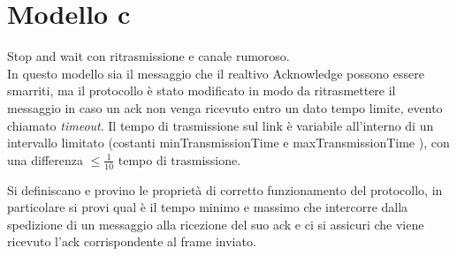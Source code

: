 \documentclass[a4paper]{article}
\begin{document}
\section{Modello c}
Stop and wait con ritrasmissione e canale rumoroso.\\
In questo modello sia il messaggio che il realtivo Acknowledge possono essere smarriti, ma il protocollo è stato modificato in modo da ritrasmettere il messaggio in caso un ack non venga ricevuto entro un dato tempo limite, evento chiamato \textit{timeout}.
Il tempo di trasmissione sul link è variabile all’interno di un intervallo limitato (costanti minTransmissionTime e maxTransmissionTime ), con una differenza $\leq \frac{1}{10}$ tempo di trasmissione.

Si definiscano e provino le proprietà di corretto funzionamento del protocollo, in particolare si provi qual è il tempo minimo e massimo che intercorre dalla spedizione di un messaggio alla ricezione del suo ack e ci si assicuri che viene ricevuto l'ack corrispondente al frame inviato.

\end{document}
